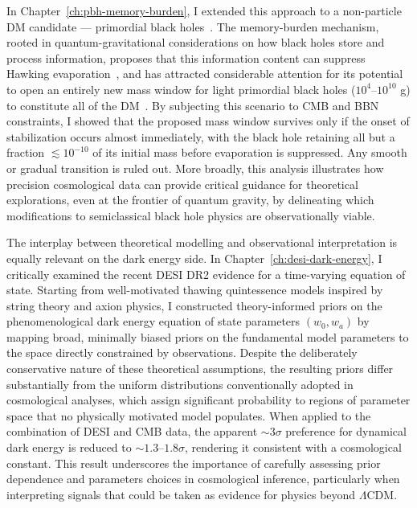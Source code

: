 In Chapter~\ref{ch:pbh-memory-burden}, I extended this approach to a non-particle DM candidate --- primordial black holes~\cite{Zeldovich:1967lct, Hawking:1971ei, Chapline:1975ojl}. The memory-burden mechanism, rooted in quantum-gravitational considerations on how black holes store and process information, proposes that this information content can suppress Hawking evaporation~\cite{Dvali:2018xpy, Dvali:2018ytn, Dvali:2020wft}, and has attracted considerable attention for its potential to open an entirely new mass window for light primordial black holes ($10^4$--$10^{10}$ g) to constitute all of the DM~\cite{Alexandre:2024nuo, Dvali:2024hsb, Thoss:2024hsr}. By subjecting this scenario to CMB and BBN constraints, I showed that the proposed mass window survives only if the onset of stabilization occurs almost immediately, with the black hole retaining all but a fraction $\lesssim 10^{-10}$  of its initial mass before evaporation is suppressed. Any smooth or gradual transition is ruled out.  More broadly, this analysis illustrates how precision cosmological data can provide critical guidance for theoretical explorations, even at the frontier of quantum gravity, by delineating which modifications to semiclassical black hole physics are observationally viable.

The interplay between theoretical modelling and observational interpretation is equally relevant on the dark energy side. In Chapter~\ref{ch:desi-dark-energy}, I critically examined the recent DESI DR2 evidence for a time-varying equation of state. Starting from well-motivated thawing quintessence models inspired by string theory and axion physics, I constructed theory-informed priors on the phenomenological dark energy equation of state parameters $(w_0, w_a)$ by mapping broad, minimally biased priors on the fundamental model parameters to the space directly constrained by observations. Despite the deliberately conservative nature of these theoretical assumptions, the resulting priors differ substantially from the uniform distributions conventionally adopted in cosmological analyses, which assign significant probability to regions of parameter space that no physically motivated model populates. When applied to the combination of DESI and CMB data, the apparent $\sim 3\sigma$ preference for dynamical dark energy is reduced to $\sim 1.3$--$1.8\sigma$, rendering it consistent with a cosmological constant. This result underscores the importance of carefully assessing prior dependence and parameters choices in cosmological inference, particularly when interpreting signals that could be taken as evidence for physics beyond $\Lambda
$CDM.

